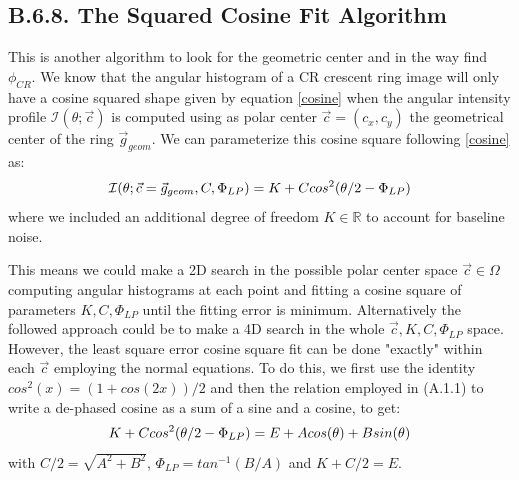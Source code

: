 \documentclass[11pt, a4paper, twoside]{article} %
\newcommand{\R}{\mathbb{R}} %
\begin{document}
\subsection*{B.6.8. The Squared Cosine Fit Algorithm}\vspace{-0.1cm}
This is another algorithm to look for the geometric center and in the way find $\phi_{CR}$. We know that the angular histogram of a CR crescent ring image will only have a cosine squared shape given by equation \eqref{cosine} when the angular intensity profile $\mathcal{I}(\theta;\vec{c})$ is computed using as polar center $\vec{c}=(c_x,c_y)$ the geometrical center of the ring $\vec{g}_{geom}$. We can parameterize this cosine square following \eqref{cosine} as:\vspace{-0.1cm}
\begin{equation}
\mathcal{I}(\theta;\vec{c}=\vec{g}_{geom}, C,\Phi_{LP})=K+Ccos^2(\theta/2-\Phi_{LP})\vspace{-0.1cm}
\end{equation}
where we included an additional degree of freedom $K\in\R$ to account for baseline noise.

This means we could make a 2D search in the possible polar center space $\vec{c}\in\Omega$ computing angular histograms at each point and fitting a cosine square of parameters $K,C,\Phi_{LP}$ until the fitting error is minimum. Alternatively the followed approach could be to make a 4D search in the whole $\vec{c},K,C,\Phi_{LP}$ space. However, the least square error cosine square fit can be done "exactly" within each $\vec{c}$ employing the normal equations. To do this, we first use the identity $cos^2(x)=(1+cos(2x))/2$ and then the relation employed in (A.1.1) to write a de-phased cosine as a sum of a sine and a cosine, to get:\vspace{-0.1cm}
\begin{equation}
K+Ccos^2(\theta/2-\Phi_{LP})=E+Acos(\theta)+Bsin(\theta)\vspace{-0.1cm}
\end{equation}
with $C/2=\sqrt{A^2+B^2}$,  $\Phi_{LP}=tan^{-1}(B/A)$ and $K+C/2=E$. 
\end{document}
